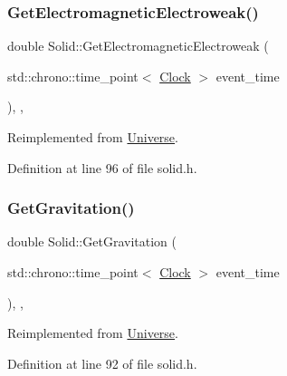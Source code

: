 \subsubsection{\texorpdfstring{Get\+Electromagnetic\+Electroweak()}{GetElectromagneticElectroweak()}}
{\footnotesize\ttfamily double Solid\+::\+Get\+Electromagnetic\+Electroweak (\begin{DoxyParamCaption}\item[{std\+::chrono\+::time\+\_\+point$<$ \mbox{\hyperlink{universe_8h_a0ef8d951d1ca5ab3cfaf7ab4c7a6fd80}{Clock}} $>$}]{event\+\_\+time }\end{DoxyParamCaption})\hspace{0.3cm}{\ttfamily [inline]}, {\ttfamily [final]}, {\ttfamily [virtual]}}



Reimplemented from \mbox{\hyperlink{class_universe_a9f099605c082e7fa755787a6a8cab7ba}{Universe}}.



Definition at line 96 of file solid.\+h.

\mbox{\label{class_solid_ab5ecb5598be93fe3cd2a21c0cfd363c8}} 
\subsubsection{\texorpdfstring{Get\+Gravitation()}{GetGravitation()}}
{\footnotesize\ttfamily double Solid\+::\+Get\+Gravitation (\begin{DoxyParamCaption}\item[{std\+::chrono\+::time\+\_\+point$<$ \mbox{\hyperlink{universe_8h_a0ef8d951d1ca5ab3cfaf7ab4c7a6fd80}{Clock}} $>$}]{event\+\_\+time }\end{DoxyParamCaption})\hspace{0.3cm}{\ttfamily [inline]}, {\ttfamily [final]}, {\ttfamily [virtual]}}



Reimplemented from \mbox{\hyperlink{class_universe_ab0404e774ee0ed66b597ff5b8e989446}{Universe}}.



Definition at line 92 of file solid.\+h.

\mbox{\label{class_solid_a256ecadf461f7232eb05c28b6b4b438a}} 
